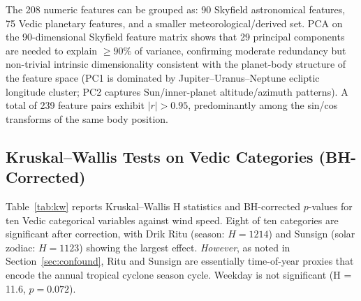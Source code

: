 \documentclass[12pt,a4paper]{article}
\begin{document}
The 208 numeric features can be grouped as: 90 Skyfield astronomical features,
75 Vedic planetary features, and a smaller meteorological/derived set.
PCA on the 90-dimensional Skyfield feature matrix shows that 29 principal components
are needed to explain $\geq 90\%$ of variance, confirming moderate redundancy
but non-trivial intrinsic dimensionality consistent with the planet-body structure
of the feature space (PC1 is dominated by Jupiter--Uranus--Neptune ecliptic longitude
cluster; PC2 captures Sun/inner-planet altitude/azimuth patterns).
A total of 239 feature pairs exhibit $|r| > 0.95$, predominantly among
the sin/cos transforms of the same body position.

\subsection{Kruskal--Wallis Tests on Vedic Categories (BH-Corrected)}
\label{sec:kw}

Table~\ref{tab:kw} reports Kruskal--Wallis H statistics and BH-corrected $p$-values
for ten Vedic categorical variables against wind speed.
Eight of ten categories are significant after correction, with Drik Ritu
(season: $H = 1214$) and Sunsign (solar zodiac: $H = 1123$) showing the largest
effect. \emph{However}, as noted in Section~\ref{sec:confound}, Ritu and Sunsign are
essentially time-of-year proxies that encode the annual tropical cyclone season cycle.
Weekday is not significant (H = 11.6, $p = 0.072$).
\end{document}
